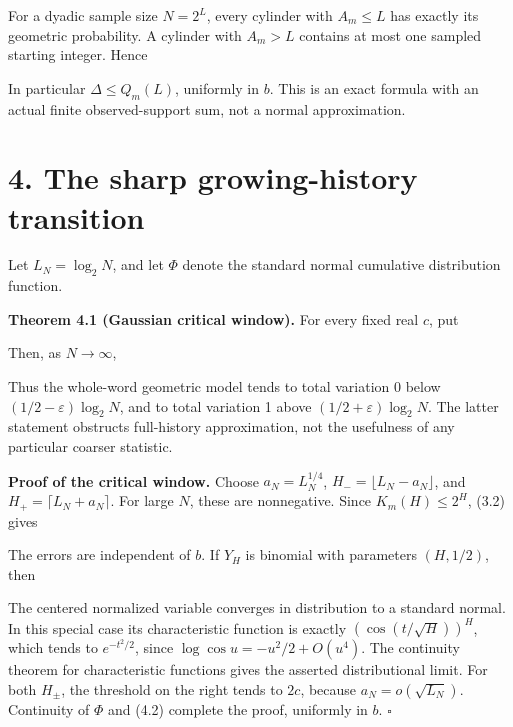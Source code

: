 For a dyadic sample size \(N=2^L\), every cylinder with \(A_m\le L\) has
exactly its geometric probability. A cylinder with \(A_m>L\) contains at
most one sampled starting integer. Hence


In particular \(\Delta\le Q_m(L)\), uniformly in \(b\). This is an exact
formula with an actual finite observed-support sum, not a normal
approximation.

\section{4. The sharp growing-history transition}

Let \(L_N=\log_2N\), and let \(\Phi\) denote the standard normal
cumulative distribution function.

\textbf{Theorem 4.1 (Gaussian critical window).} For every fixed real
\(c\), put


Then, as \(N\to\infty\),


Thus the whole-word geometric model tends to total variation 0 below
\((1/2-\varepsilon)\log_2N\), and to total variation 1 above
\((1/2+\varepsilon)\log_2N\). The latter statement obstructs
full-history approximation, not the usefulness of any particular coarser
statistic.

\textbf{Proof of the critical window.} Choose \(a_N=L_N^{1/4}\),
\(H_- =\lfloor L_N-a_N\rfloor\), and \(H_+=\lceil L_N+a_N\rceil\). For
large \(N\), these are nonnegative. Since \(K_m(H)\le2^H\), (3.2) gives


The errors are independent of \(b\). If \(Y_H\) is binomial with
parameters \((H,1/2)\), then


The centered normalized variable converges in distribution to a standard
normal. In this special case its characteristic function is exactly
\((\cos(t/\sqrt H))^H\), which tends to \(e^{-t^2/2}\), since
\(\log\cos u=-u^2/2+O(u^4)\). The continuity theorem for characteristic
functions gives the asserted distributional limit. For both \(H_\pm\),
the threshold on the right tends to \(2c\), because
\(a_N=o(\sqrt{L_N})\). Continuity of \(\Phi\) and (4.2) complete the
proof, uniformly in \(b\). \(\square\)


